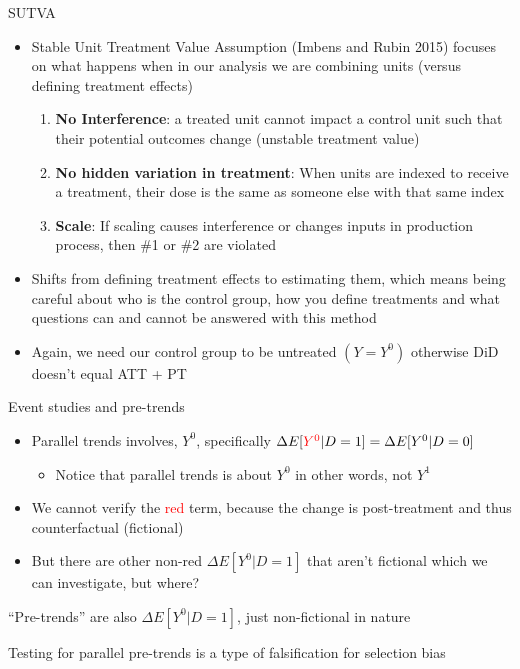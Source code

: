 \documentclass{beamer}
\begin{document}
\begin{frame}{SUTVA}

\begin{itemize}
\item Stable Unit Treatment Value Assumption (Imbens and Rubin 2015) focuses on what happens when in our analysis we are combining units (versus defining treatment effects)
	\begin{enumerate}
	\item \textbf{No Interference}: a treated unit cannot impact a control unit such that their potential outcomes change (unstable treatment value)
	\item \textbf{No hidden variation in treatment}: When units are indexed to receive a treatment, their dose is the same as someone else with that same index
	\item \textbf{Scale}: If scaling causes interference or changes inputs in production process, then \#1 or \#2 are violated
	\end{enumerate}
\item Shifts from defining treatment effects to estimating them, which means being careful about who is the control group, how you define treatments and what questions can and cannot be answered with this method
\item Again, we need our control group to be untreated $(Y=Y^0)$ otherwise DiD doesn't equal ATT + PT
\end{itemize}

\end{frame}




\begin{frame}{Event studies and pre-trends}

\begin{itemize}
	\item Parallel trends involves, $Y^0$, specifically $\Delta E[\textcolor{red}{Y^0}|D=1] = \Delta E[Y^0|D=0]$ 
		\begin{itemize}
		\item  Notice that parallel trends is about $Y^0$ in other words, not $Y^1$
		\end{itemize}
	\item We cannot verify the \textcolor{red}{red} term, because the change is post-treatment and thus counterfactual (fictional)
	\item But there are other non-red $\Delta E[Y^0|D=1]$ that aren't fictional which we can investigate, but where?
\end{itemize}

\bigskip

``Pre-trends'' are also $\Delta E[Y^0|D=1]$, just non-fictional in nature

\bigskip

Testing for parallel pre-trends is a type of falsification for selection bias

\end{frame}
\end{document}
